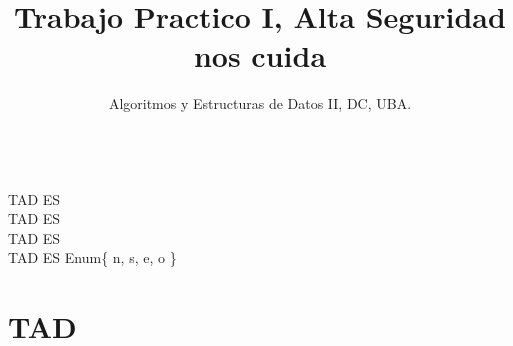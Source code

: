 \documentclass[8pt, a4paper]{article}
\author{Algoritmos y Estructuras de Datos II, DC, UBA.}
\date{}
\title{Trabajo Practico I, Alta Seguridad nos cuida}
\begin{document}
\thispagestyle{empty}

\maketitle
\tableofcontents

\newpage


\ \\
TAD  ES  \\
TAD  ES  \\
TAD  ES  \\
TAD  ES Enum\{ n, s, e, o \}


\section{TAD }
\end{document}
